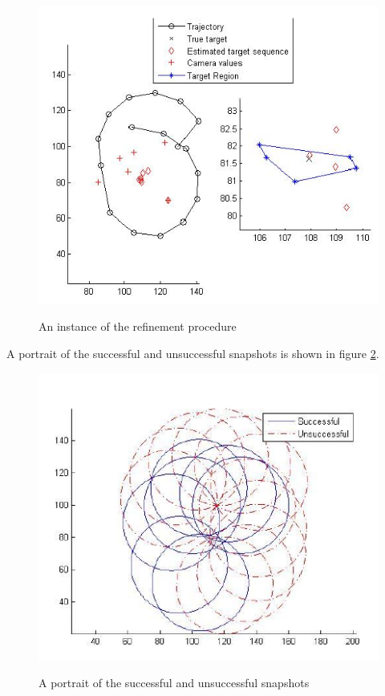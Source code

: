 \begin{figure}
\centering
\includegraphics[scale=1]{Figures/mission_phase2_a}
\label{fig_mission_phase2_a}
\caption{An instance of the refinement procedure}
\end{figure}

A portrait of the successful and unsuccessful snapshots is shown in figure \ref{fig_mission_phase2_b}. 

\begin{figure}
\centering
\includegraphics[scale=1]{Figures/mission_phase2_b}
\label{fig_mission_phase2_b}
\caption{A portrait of the successful and unsuccessful snapshots}
\end{figure}

